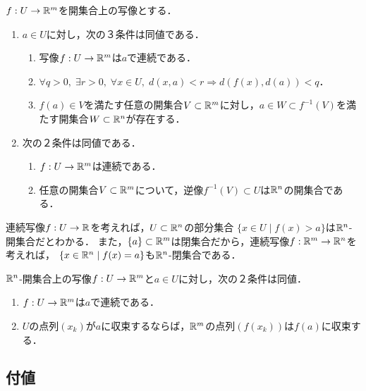 \documentclass[uplatex,dvipdfmx]{jsreport}
\begin{document}
\begin{proposition}[連続写像の特徴付け]\label{prop-characterization-of-continuous-map-in-metric-spaces}
    $f:U\to\mathbb{R}^m$を開集合上の写像とする．
    \begin{enumerate}
        \item $a\in U$に対し，次の３条件は同値である．
        \begin{enumerate}[(1)]
            \item 写像$f:U\to\mathbb{R}^m$は$a$で連続である．
            \item $\forall q>0,\;\exists r>0,\; \forall x\in U,\; d(x,a)<r\Rightarrow d(f(x),d(a))<q$．
            \item $f(a)\in V$を満たす任意の開集合$V\subset\mathbb{R}^m$に対し，$a\in W\subset f^{-1}(V)$を満たす開集合$W\subset\mathbb{R}^n$が存在する．
        \end{enumerate}
        \item  次の２条件は同値である．
        \begin{enumerate}[(1)]
            \item $f:U\to\mathbb{R}^m$は連続である．
            \item 任意の開集合$V\subset\mathbb{R}^m$について，逆像$f^{-1}(V)\subset U$は$\mathbb{R}^n$の開集合である．
        \end{enumerate}
    \end{enumerate}
\end{proposition}
\begin{remark}
    連続写像$f:U\to\mathbb{R}$を考えれば，$U\subset\mathbb{R}^n$の部分集合
    $\{x\in U\mid f(x)>a\}$は$\mathbb{R}^n$-開集合だとわかる．
    また，$\{a\}\subset\mathbb{R}^m$は閉集合だから，連続写像$f:\mathbb{R}^m\to\mathbb{R}^n$を考えれば，
    $\{x\in\mathbb{R}^n\mid f(x)=a\}$も$\mathbb{R}^n$-閉集合である．
\end{remark}

\begin{proposition}[連続写像の特徴付け]
    $\mathbb{R}^n$-開集合上の写像$f:U\to\mathbb{R}^m$と$a\in U$に対し，次の２条件は同値．
    \begin{enumerate}
        \item $f:U\to\mathbb{R}^m$は$a$で連続である．
        \item $U$の点列$(x_k)$が$a$に収束するならば，$\mathbb{R}^m$の点列$(f(x_k))$は$f(a)$に収束する．
    \end{enumerate}
\end{proposition}

\subsection{付値}
\end{document}
